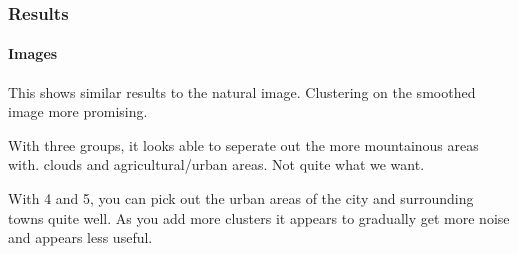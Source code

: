 \documentclass[11pt]{article}
\begin{document}
    \begin{center}
    \end{center}
    { \hspace*{\fill} \\}
    
    \begin{center}
    \end{center}
    { \hspace*{\fill} \\}
    
    \begin{center}
    \end{center}
    { \hspace*{\fill} \\}
    
    \begin{center}
    \end{center}
    { \hspace*{\fill} \\}
    
    \begin{center}
    \end{center}
    { \hspace*{\fill} \\}
    
    \subsubsection{Results}\label{results}

\paragraph{Images}\label{images}

This shows similar results to the natural image. Clustering on the
smoothed image more promising.

With three groups, it looks able to seperate out the more mountainous
areas with. clouds and agricultural/urban areas. Not quite what we want.

With 4 and 5, you can pick out the urban areas of the city and
surrounding towns quite well. As you add more clusters it appears to
gradually get more noise and appears less useful.
\end{document}
